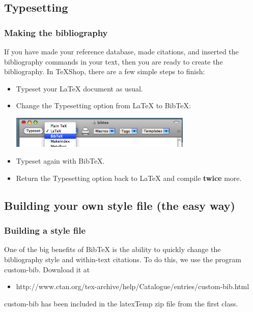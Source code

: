 \subsection{Typesetting}

\begin{frame}  \frametitle{Making the bibliography}
If you have made your reference database, made citations, and inserted the bibliography commands in your text, then you are ready to create the bibliography. In TeXShop, there are a few simple steps to finish:
\begin{itemize}
\item Typeset your LaTeX document as usual.
\item Change the Typesetting option from LaTeX to BibTeX:

\vspace{1mm}

\includegraphics[height=15mm]{bibtex/bibtexTypeset}\hspace{4mm}{}

\item Typeset again with BibTeX.
\item Return the Typesetting option back to LaTeX and compile \textbf{twice} more.
\end{itemize}
\end{frame}

\subsection{Building your own style file (the easy way)}

\begin{frame}  \frametitle{Building a style file}
One of the big benefits of BibTeX is the ability to quickly change the bibliography style and within-text citations. To do this, we use the program {\color{highlight}custom-bib}. Download it at
\begin{itemize}\small 
\item[] \color{highlight} http://www.ctan.org/tex-archive/help/Catalogue/entries/custom-bib.html
\end{itemize}
custom-bib has been included in the {\color{highlight}latexTemp} zip file from the first class.
\end{frame}

